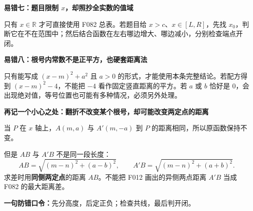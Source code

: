 \clearpage
\begin{trapbox}
\textbf{\textcolor{CTrap}{易错七：题目限制 $x$，却照抄全实数的值域}}



只有 $x\in\mathbb R$ 才可直接使用 F082 总表。若题目给 $x>c$、$x\in[L,R]$，先找 $x_0$，判断它在不在范围中；然后结合函数在左右哪边增大、哪边减小，分别检查端点开闭。

\textbf{\textcolor{CTrap}{易错八：根号内常数不是正平方，也硬套距离法}}

只有能写成 $(x-m)^2+a^2$ 且 $a>0$ 的形式，才能使用本条完整结论。若配方得到 $(x-m)^2-4$，不能把 $-4$ 看作固定竖直距离的平方。若 $a$ 或 $b$ 恰好是 $0$，会出现绝对值，等号位置也可能有多种情况，必须另外处理。
\end{trapbox}
\clearpage
\begin{trapbox}
\textbf{\textcolor{CTrap}{再记一个小心之处：翻折不改变某个根号，却可能改变两定点的距离}}



当 $P$ 在 $x$ 轴上，$A(m,a)$ 与 $A'(m,-a)$ 到 $P$ 的距离相同，所以原函数保持不变。

但是 $AB$ 与 $A'B$ 不是同一段长度：
\[
 AB=\sqrt{(m-n)^2+(a-b)^2},\qquad
 A'B=\sqrt{(m-n)^2+(a+b)^2}.
\]
求差时用\textbf{同侧两定点}的距离 $AB$。不能把 F012 画出的异侧两点距离 $A'B$ 当成 F082 的最大距离差。

\textbf{一句防错口令：}先分高度，后定正负；检查共线，最后判开闭。
\end{trapbox}
